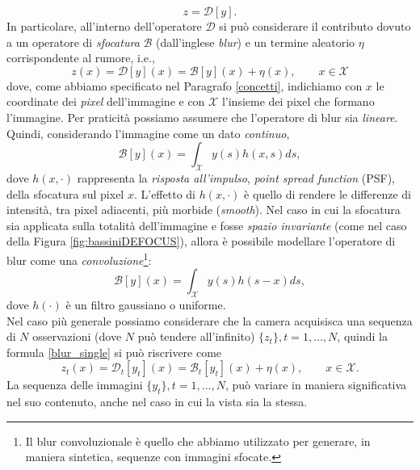 \begin{equation}
z=\mathcal{D}[y].
\end{equation}
In particolare, all'interno dell'operatore $\mathcal{D}$ si pu\`o considerare il contributo dovuto a un operatore di \textit{sfocatura} $\mathcal{B}$ (dall'inglese \textit{blur}) e un termine aleatorio $\eta$ corrispondente al rumore, i.e.,
\begin{equation}
\label{blur_single}
z(x)=\mathcal{D}[y](x) = \mathcal{B}[y](x) + \eta(x), \qquad x \in \mathcal{X}
\end{equation}
dove, come abbiamo specificato nel Paragrafo \ref{concetti}, indichiamo con $x$ le coordinate dei \textit{pixel} dell'immagine e con $\mathcal{X}$ l'insieme dei pixel che formano l'immagine. 
Per praticit\`a possiamo assumere che l'operatore di blur sia \textit{lineare}.
Quindi, considerando l'immagine come un dato \textit{continuo},
\begin{equation}
\label{eq:blur}
\mathcal{B}[y](x) = \int_{\mathcal{X}}y(s)h(x,s)ds,
\end{equation}
dove $h(x,\cdot)$ rappresenta la \textit{risposta all'impulso}, \textit{point spread function} (PSF), della sfocatura sul pixel $x$.
L'effetto di $h(x, \cdot)$ \`e quello di rendere le differenze di intensit\`a, tra pixel adiacenti, pi\`u morbide (\textit{smooth}).
Nel caso in cui la sfocatura sia applicata sulla totalit\`a dell'immagine e fosse \textit{spazio invariante} (come nel caso della Figura \ref{fig:bassiniDEFOCUS}), allora \`e possibile modellare l'operatore di blur come una \textit{convoluzione}\footnote{Il blur convoluzionale \`e quello che abbiamo utilizzato per generare, in maniera sintetica, sequenze con immagini sfocate.}:
\begin{equation}
\label{blur_convolution}
\mathcal{B}[y](x) = \int_{\mathcal{X}}y(s)h(s-x)ds,
\end{equation}
dove $h(\cdot)$ \`e un filtro gaussiano o uniforme.\\
Nel caso pi\`u generale possiamo considerare che la camera acquisisca una sequenza di $N$ osservazioni (dove $N$ pu\`o tendere all'infinito) $\{z_t\}, t = 1, \dots ,N$, quindi la formula \eqref{blur_single} si pu\`o riscrivere come
\begin{equation}
\label{blur_multi}
z_t(x)=\mathcal{D}_t[y_t](x) = \mathcal{B}_t[y_t](x) + \eta(x), \qquad x \in \mathcal{X}.
\end{equation}
La sequenza delle immagini $\{y_t\}, t = 1,\dots , N$, pu\`o variare in maniera significativa nel suo contenuto, anche nel caso in cui la vista sia la stessa.
